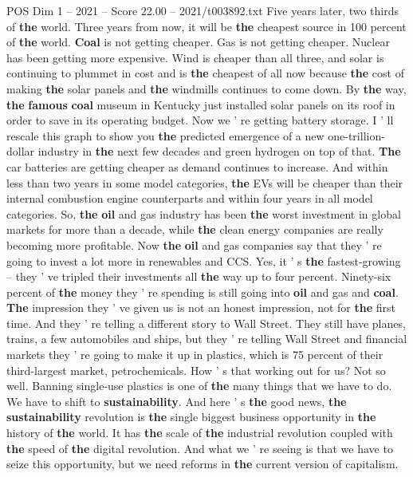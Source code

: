 \begin{textsample}{POS Dim 1 – 2021 – Score 22.00 – 2021/t003892.txt}
Five years later, two thirds of \textbf{the} world.
Three years from now, it will be \textbf{the} cheapest source in 100 percent of \textbf{the} world. \textbf{Coal} is not getting cheaper.
Gas is not getting cheaper.
Nuclear has been getting more expensive.
Wind is cheaper than all three, and solar is continuing to plummet in cost and is \textbf{the} cheapest of all now because \textbf{the} cost of making \textbf{the} solar panels and \textbf{the} windmills continues to come down.
By \textbf{the} way, \textbf{the} \textbf{famous} \textbf{coal} museum in Kentucky just installed solar panels on its roof in order to save in its operating budget.
Now we ' re getting battery storage.
I ' ll rescale this graph to show you \textbf{the} predicted emergence of a new one-trillion-dollar industry in \textbf{the} next few decades and green hydrogen on top of that. \textbf{The} car batteries are getting cheaper as demand continues to increase.
And within less than two years in some model categories, \textbf{the} EVs will be cheaper than their internal combustion engine counterparts and within four years in all model categories.
So, \textbf{the} \textbf{oil} and gas industry has been \textbf{the} worst investment in global markets for more than a decade, while \textbf{the} clean energy companies are really becoming more profitable.
Now \textbf{the} \textbf{oil} and gas companies say that they ' re going to invest a lot more in renewables and CCS.
Yes, it ' s \textbf{the} fastest-growing -- they ' ve tripled their investments all \textbf{the} way up to four percent.
Ninety-six percent of \textbf{the} money they ' re spending is still going into \textbf{oil} and gas and \textbf{coal}. \textbf{The} impression they ' ve given us is not an honest impression, not for \textbf{the} first time.
And they ' re telling a different story to Wall Street.
They still have planes, trains, a few automobiles and ships, but they ' re telling Wall Street and financial markets they ' re going to make it up in plastics, which is 75 percent of their third-largest market, petrochemicals.
How ' s that working out for us?
Not so well.
Banning single-use plastics is one of \textbf{the} many things that we have to do.
We have to shift to \textbf{sustainability}.
And here ' s \textbf{the} good news, \textbf{the} \textbf{sustainability} revolution is \textbf{the} single biggest business opportunity in \textbf{the} history of \textbf{the} world.
It has \textbf{the} scale of \textbf{the} industrial revolution coupled with \textbf{the} speed of \textbf{the} digital revolution.
And what we ' re seeing is that we have to seize this opportunity, but we need reforms in \textbf{the} current version of capitalism.

\end{textsample}
